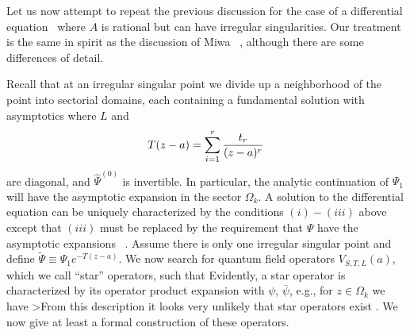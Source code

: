
Let us now attempt to repeat the 
previous discussion for the case of 
a differential equation \diffl\ where 
$A$ is rational but can have irregular singularities. 
Our treatment is the same in spirit as the discussion of 
Miwa \miwai\ , although there are some
differences of detail.

Recall that
at an irregular singular point we divide up a neighborhood 
of the point into sectorial domains, each containing 
a fundamental solution with asymptotics 
\eqn{}
where $L$ and 
$$T(z-a)=\sum_{i=1}^{r}{t_r\over (z-a)^r}$$ 
are diagonal, and $\hat \Psi^{(0)}$ 
is invertible. In 
particular, 
the analytic continuation of $\Psi_1$ will have the asymptotic 
expansion 
\eqn{}
in the sector $\Omega_k$. 
A solution to the differential equation can be uniquely characterized
by the conditions $(i)-(iii)$ above except that $(iii)$ must
be replaced by the requirement that $\Psi$ have the asymptotic
expansions \stoki\ . 
Assume there is only one
irregular singular point and
define $\tilde \Psi\equiv \Psi_1 e^{-T(z-a)}$. 
We now search for quantum 
field operators $V_{S,T,L}(a)$, which we call ``star'' operators,
such that 
\eqn{}
Evidently,
a star operator is characterized by its operator product expansion 
with $\psi$, $\bar\psi$, e.g., for $z\in \Omega_k$ we have
\eqn{}
>From this description it looks very unlikely that star operators
exist 
.
We now give at least a formal construction of these operators.

